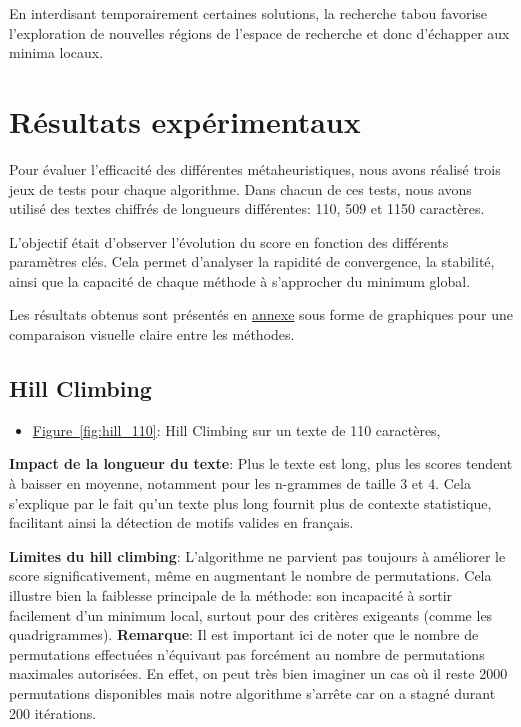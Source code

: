 \documentclass[a4paper]{article}
\begin{document}
En interdisant temporairement certaines solutions, la recherche tabou favorise l'exploration de nouvelles régions de l'espace de recherche et donc d'échapper aux minima locaux.

\section{Résultats expérimentaux}

Pour évaluer l’efficacité des différentes métaheuristiques, nous avons réalisé trois jeux de tests pour chaque algorithme. Dans chacun de ces tests, nous avons utilisé des textes chiffrés de longueurs différentes: 110, 509 et 1150 caractères.

L'objectif était d'observer l’évolution du score en fonction des différents paramètres clés. Cela permet d’analyser la rapidité de convergence, la stabilité, ainsi que la capacité de chaque méthode à s’approcher du minimum global.

Les résultats obtenus sont présentés en \hyperref[sec:annexes]{annexe} sous forme de graphiques pour une comparaison visuelle claire entre les méthodes.

\subsection{Hill Climbing}

\begin{itemize}
    \item \hyperref[fig:hill_110]{Figure~\ref*{fig:hill_110}}: Hill Climbing sur un texte de 110 caractères,
\end{itemize}

\textbf{Impact de la longueur du texte}: Plus le texte est long, plus les scores tendent à baisser en moyenne, notamment pour les n-grammes de taille $3$ et $4$. Cela s'explique par le fait qu’un texte plus long fournit plus de contexte statistique, facilitant ainsi la détection de motifs valides en français.

\textbf{Limites du hill climbing}: L’algorithme ne parvient pas toujours à améliorer le score significativement, même en augmentant le nombre de permutations. Cela illustre bien la faiblesse principale de la méthode: son incapacité à sortir facilement d’un minimum local, surtout pour des critères exigeants (comme les quadrigrammes).
\textbf{Remarque}: Il est important ici de noter que le nombre de permutations effectuées n'équivaut pas forcément au nombre de permutations maximales autorisées. En effet, on peut très bien imaginer un cas où il reste 2000 permutations disponibles mais notre algorithme s'arrête car on a stagné durant 200 itérations.
\end{document}
